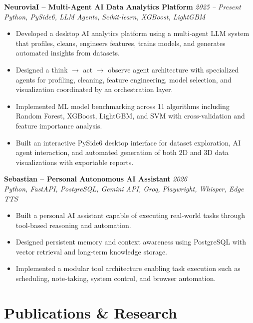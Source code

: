 \documentclass[11pt]{article}
\begin{document}
\textbf{NeuroviaI -- Multi-Agent AI Data Analytics Platform} \hfill \textit{2025 -- Present} \\
\textit{Python, PySide6, LLM Agents, Scikit-learn, XGBoost, LightGBM}
\begin{itemize}
\item Developed a desktop AI analytics platform using a multi-agent LLM system that profiles, cleans, engineers features, trains models, and generates automated insights from datasets.
\item Designed a think $\rightarrow$ act $\rightarrow$ observe agent architecture with specialized agents for profiling, cleaning, feature engineering, model selection, and visualization coordinated by an orchestration layer.
\item Implemented ML model benchmarking across 11 algorithms including Random Forest, XGBoost, LightGBM, and SVM with cross-validation and feature importance analysis.
\item Built an interactive PySide6 desktop interface for dataset exploration, AI agent interaction, and automated generation of both 2D and 3D data visualizations with exportable reports.
\end{itemize}

\textbf{Sebastian -- Personal Autonomous AI Assistant} \hfill \textit{2026} \\
\textit{Python, FastAPI, PostgreSQL, Gemini API, Groq, Playwright, Whisper, Edge TTS}
\begin{itemize}
\item Built a personal AI assistant capable of executing real-world tasks through tool-based reasoning and automation.
\item Designed persistent memory and context awareness using PostgreSQL with vector retrieval and long-term knowledge storage.
\item Implemented a modular tool architecture enabling task execution such as scheduling, note-taking, system control, and browser automation.
\end{itemize}

\section*{Publications \& Research}
\end{document}
